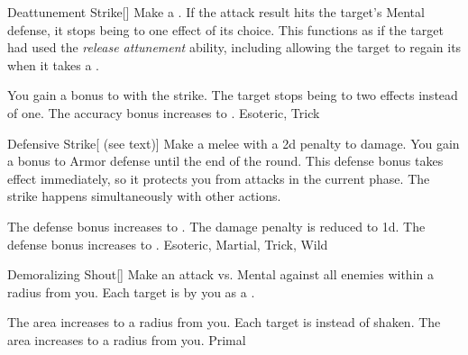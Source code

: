 \lowercase{\hypertarget{maneuver:Deattunement Strike}{}}\label{maneuver:Deattunement Strike}
\hypertarget{maneuver:Deattunement Strike}{}
\begin{freeability}{Deattunement Strike}[]
Make a .
If the attack result hits the target's Mental defense,
it stops being  to one effect of its choice.
This functions as if the target had used the \textit{release attunement} ability,
including allowing the target to regain its  when it takes a .

\rankline
{} You gain a  bonus to  with the strike.
 The target stops being  to two effects instead of one.
 The accuracy bonus increases to .
 Esoteric, Trick
\end{freeability}
\vspace{0.25em}



\lowercase{\hypertarget{maneuver:Defensive Strike}{}}\label{maneuver:Defensive Strike}
\hypertarget{maneuver:Defensive Strike}{}
\begin{freeability}{Defensive Strike}[ (see text)]
Make a melee  with a \minus2d penalty to damage.
You gain a  bonus to Armor defense until the end of the round.
This defense bonus takes effect immediately, so it protects you from attacks in the current phase.
The strike happens simultaneously with other actions.

\rankline
{} The defense bonus increases to .
 The damage penalty is reduced to \minus1d.
 The defense bonus increases to .
 Esoteric, Martial, Trick, Wild
\end{freeability}
\vspace{0.25em}



\lowercase{\hypertarget{maneuver:Demoralizing Shout}{}}\label{maneuver:Demoralizing Shout}
\hypertarget{maneuver:Demoralizing Shout}{}
\begin{freeability}{Demoralizing Shout}[]
Make an attack vs. Mental against all enemies within a \areasmall radius from you.
\hit Each target is  by you as a .

\rankline
{} The area increases to a \areamed radius from you.
 Each target is  instead of shaken.
 The area increases to a \areahuge radius from you.
 Primal
\end{freeability}
\vspace{0.25em}



